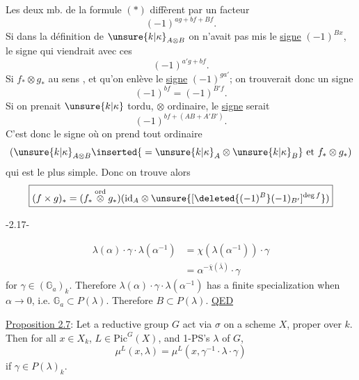 Les deux mb. de la formule $(*)$ diffèrent par un facteur
\[
(-1)^{ag+bf+Bf}.
\]
Si dans la définition de $\unsure{k|\kappa}_{A\otimes B}$ on n'avait pas mis le \uline{signe} $(-1)^{Bx}$, le signe qui viendrait avec ces 
\[
(-1)^{a'g+bf}.
\]
Si   $f_*\otimes g_*$ au sens , et qu'on  enlève le \uline{signe} $(-1)^{ga'}$; on trouverait donc un signe
\[
(-1)^{bf}=(-1)^{B'f}.
\]
Si on prenait $\unsure{k|\kappa}$ tordu, $\otimes$ ordinaire, le \uline{signe} serait
\[
(-1)^{bf+(AB+A'B')}.
\]
C'est donc le signe où on prend tout ordinaire
\[
(\unsure{k|\kappa}_{A\otimes B}\inserted{{}=\unsure{k|\kappa}_A\otimes\unsure{k|\kappa}_B}\text{ et }f_*\otimes g_*)
\]
qui est le plus simple. Donc on trouve alors
\[
\boxed{(f\times g)_*=(f_*\overset{\mathrm{ord}}\otimes g_*)
(\mathrm{id}_A\otimes\unsure{[\deleted{(-1)^B}(-1)_{B'}]^{\deg f}})}
\]
\begin{center}-2.17-\end{center}
\[
\begin{aligned}
\lambda(\alpha)\cdot\gamma\cdot\lambda(\alpha^{-1})
&=\chi(\lambda(\alpha^{-1}))\cdot\gamma\\
&=\alpha^{-\bar\chi(\bar\lambda)}\cdot\gamma
\end{aligned}
\]
for $\gamma\in(\mathbb G_a)_k$. Therefore $\lambda(\alpha)\cdot\gamma\cdot\lambda(\alpha^{-1})$ has a finite specialization when $\alpha\longrightarrow0$, i.e. $\mathbb G_a\subset P(\lambda)$. Therefore $B\subset P(\lambda)$. \uline{QED}

\uline{Proposition 2.7}: Let a reductive group $G$ act via $\sigma$ on a scheme $X$, proper over $k$. Then for all $x\in X_k$, $L\in\mathrm{Pic}^G(X)$, and 1-PS's $\lambda$ of $G$,
\[
\mu^L(x,\lambda)=\mu^L(x,\gamma^{-1}\cdot\lambda\cdot\gamma)
\]
if $\gamma\in P(\lambda)_k$.

